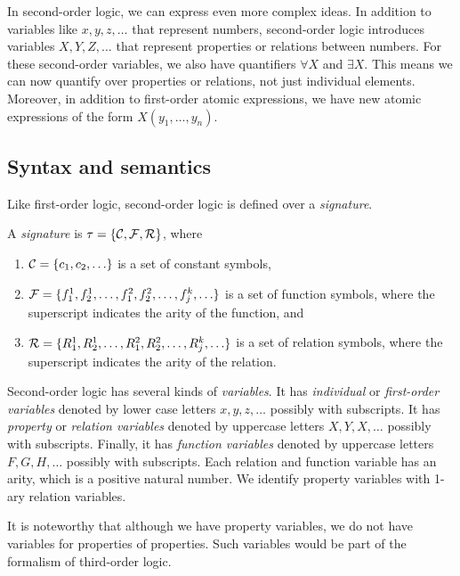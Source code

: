 \documentclass[11pt,twoside=off,numbers=noenddot]{scrbook}
\begin{document}
In second-order logic, we can express even more complex ideas. In
addition to variables like $x, y, z, \dots$ that represent numbers,
second-order logic introduces variables $X, Y, Z, \dots$ that
represent properties or relations between numbers. For these
second-order variables, we also have quantifiers $\forall X$ and
$\exists X$. This means we can now quantify over properties or
relations, not just individual elements. Moreover, in addition to
first-order atomic expressions, we have new atomic expressions of the
form $X(y_1, \dots, y_n)$.

\subsection{Syntax and semantics}
Like first-order logic, second-order logic is defined over a \emph{signature}.

\begin{definition}
  A \emph{signature} is $\tau = \{ \mathcal{C}, \mathcal{F}, \mathcal{R} \}$, where
  \begin{enumerate}
    \item $\consts = \set{c_1, c_2, \dots}$ is a set of constant symbols,
    \item $\funcs = \set{f_1^1, f_2^1, \dots, f_1^2, f_2^2, \dots,
      f_j^k, \dots}$ is a set of function symbols, where the
      superscript indicates the arity of the function, and
    \item $\rels = \set{R_1^1, R_2^1, \dots, R_1^2, R_2^2, \dots,
      R_j^k, \dots}$ is a set of relation symbols, where the
      superscript indicates the arity of the relation.
  \end{enumerate}
\end{definition}

Second-order logic has several kinds of \emph{variables}. It has
\emph{individual} or \emph{first-order variables} denoted by lower
case letters $x, y, z, \dots$ possibly with subscripts. It has
\emph{property} or \emph{relation variables} denoted by uppercase
letters $X, Y, X, \dots$ possibly with subscripts. Finally, it has
\emph{function variables} denoted by uppercase letters $F, G, H,
\dots$ possibly with subscripts. Each relation and function variable
has an arity, which is a positive natural number. We identify
property variables with 1-ary relation variables.

\begin{remark}
  It is noteworthy that although we have property variables, we do
  not have variables for properties of properties. Such variables
  would be part of the formalism of third-order logic.
\end{remark}
\end{document}

